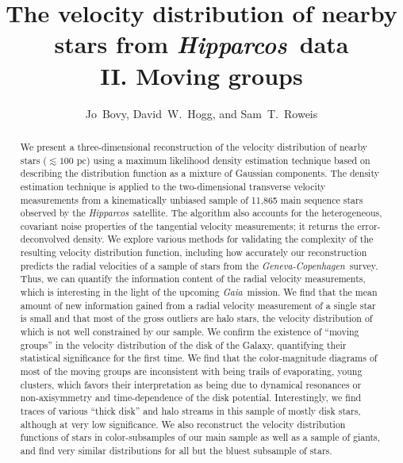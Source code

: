 \documentclass[12pt,preprint]{aastex}
\newcounter{address}
\newcommand{\Hipparcos}{\textit{Hipparcos}}
\newcommand{\Gaia}{\textit{Gaia}}
\newcommand{\gcs}{\textit{Geneva-Copenhagen}}
\begin{document}
\title{
The velocity distribution of nearby stars from \Hipparcos\ data\\
II. Moving groups
}
\author{
Jo~Bovy\altaffilmark{\ref{NYU},\ref{email}}, 
David~W.~Hogg\altaffilmark{\ref{NYU}}, 
and Sam~T.~Roweis\altaffilmark{\ref{Toronto},\ref{Google}}} 
\setcounter{address}{1}
\date{}

\begin{abstract}
We present a three-dimensional reconstruction of the velocity
distribution of nearby stars ($\lesssim 100$ pc) using a maximum
likelihood density estimation technique based on describing the
distribution function as a mixture of Gaussian components. The density
estimation technique is applied to the two-dimensional transverse
velocity measurements from a kinematically unbiased sample of 11,865
main sequence stars observed by the \Hipparcos\ satellite. The
algorithm also accounts for the heterogeneous, covariant noise
properties of the tangential velocity measurements; it returns the
error-deconvolved density. We explore various methods for validating
the complexity of the resulting velocity distribution function,
including how accurately our reconstruction predicts the radial
velocities of a sample of stars from the \gcs\ survey. Thus, we can
quantify the information content of the radial velocity measurements,
which is interesting in the light of the upcoming \Gaia\ mission. We
find that the mean amount of new information gained from a radial
velocity measurement of a single star is small and that most of the
gross outliers are halo stars, the velocity distribution of which is
not well constrained by our sample. We confirm the existence of
``moving groups'' in the velocity distribution of the disk of the
Galaxy, quantifying their statistical significance for the first
time. We find that the color-magnitude diagrams of most of the moving
groups are inconsistent with being trails of evaporating, young
clusters, which favors their interpretation as being due to dynamical
resonances or non-axisymmetry and time-dependence of the disk
potential.  Interestingly, we find traces of various ``thick disk''
and halo streams in this sample of mostly disk stars, although at very
low significance. We also reconstruct the velocity distribution
functions of stars in color-subsamples of our main sample as well as a
sample of giants, and find very similar distributions for all but the
bluest subsample of stars.
\end{abstract}
\end{document}
